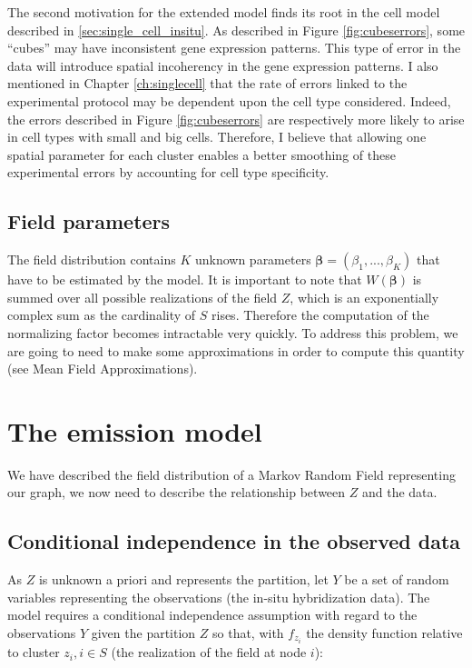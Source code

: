   The second motivation for the extended model finds its root in the cell model described in \ref{sec:single_cell_insitu}. As described in Figure \ref{fig:cubeserrors}, some ``cubes'' may have inconsistent gene expression patterns. This type of error in the data will introduce spatial incoherency in the gene expression patterns. I also mentioned in Chapter \ref{ch:singlecell} that the rate of errors linked to the experimental protocol may be dependent upon the cell type considered. Indeed, the errors described in Figure \ref{fig:cubeserrors} are respectively more likely to arise in cell types with small and big cells. Therefore, I believe that allowing one spatial parameter for each cluster enables a better smoothing of these experimental errors by accounting for cell type specificity.\\
 
 \subsection{Field parameters}

The field distribution contains $K$ unknown parameters $\boldsymbol{\beta} = (\beta_{1},...,\beta_{K})$ that have to be estimated by the model. It is important to note that $W(\boldsymbol{\beta})$ is summed over all possible realizations of the field $Z$, which is an exponentially complex sum as the cardinality of $S$ rises. Therefore the computation of the normalizing factor becomes intractable very quickly. To address this problem, we are going to need to make some approximations in order to compute this quantity (see Mean Field Approximations).\\

\section{The emission model}

We have described the field distribution of a Markov Random Field representing our graph, we now need to describe the relationship between $Z$ and the data.

\subsection{Conditional independence in the observed data}
As $Z$ is unknown a priori and represents the partition, let $Y$ be a set of random variables representing the observations (the in-situ hybridization data). The model requires a conditional independence assumption with regard to the observations $Y$ given the partition $Z$ so that, with $f_{z_i}$ the density function relative to cluster $z_i, i \in S$ (the realization of the field at node $i$):

